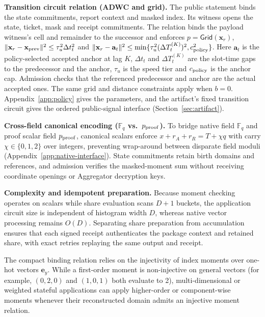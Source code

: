 \documentclass[conference,compsoc]{IEEEtran}
\theoremstyle{definition}
\numberwithin{equation}{section}
\numberwithin{table}{section}
\numberwithin{figure}{section}
\theoremstyle{plain}
\begin{document}
\noindent\textbf{Transition circuit relation (ADWC and grid).}
The public statement binds the state commitments, report context and masked
index. Its witness opens the state, ticket, mask and receipt commitments.
The relation binds the payload witness's cell and
remainder to the successor and enforces
\(p=\mathsf{Grid}(\mathbf x_r)\),
\(\|\mathbf x_r-\mathbf x_{\rm prev}\|^2\le\tau_u^2\Delta t_t^2\) and
\(\|\mathbf x_r-\mathbf a_t\|^2\le
\min\{\tau_u^2(\Delta T_t^{(K)})^2,c_{\rm policy}^2\}\).
Here \(\mathbf a_t\) is the policy-selected accepted anchor at lag \(K\),
\(\Delta t_t\) and \(\Delta T_t^{(K)}\) are the slot-time gaps to the predecessor
and the anchor, \(\tau_u\) is the
speed tier and \(c_{\rm policy}\) is the anchor cap. Admission checks that the
referenced predecessor and anchor are the actual accepted ones. The same grid
and distance constraints apply when \(b=0\). Appendix~\ref{app:policy} gives
the parameters, and the artifact's fixed transition circuit gives the ordered
public-signal interface (Section~\ref{sec:artifact}).

\noindent\textbf{Cross-field canonical encoding (\(\mathbb F_q\) vs.\ \(p_{\rm proof}\)).}
To bridge native field \(\mathbb F_q\) and proof scalar field \(p_{\rm proof}\),
canonical scalars enforce \(x+r_A+r_R=T+\chi q\) with carry \(\chi\in\{0,1,2\}\) over integers,
preventing wrap-around between disparate field moduli (Appendix~\ref{app:native-interface}).
State commitments retain birth domains and references, and admission verifies the
masked-moment sum without receiving coordinate openings or Aggregator decryption keys.

\noindent\textbf{Complexity and idempotent preparation.}
Because moment checking operates on scalars while share evaluation scans \(D+1\) buckets,
the application circuit size is independent of histogram width \(D\), whereas native vector
processing remains \(O(D)\). Separating share preparation from accumulation ensures that each
signed receipt authenticates the package context and retained share, with exact retries
replaying the same output and receipt.

The compact binding relation relies on the injectivity of index moments over one-hot vectors $\mathbf e_y$. While a first-order moment is non-injective on general vectors (for example, $(0, 2, 0)$ and $(1, 0, 1)$ both evaluate to 2), multi-dimensional or weighted stateful applications can apply higher-order or component-wise moments whenever their reconstructed domain admits an injective moment relation.
\end{document}
